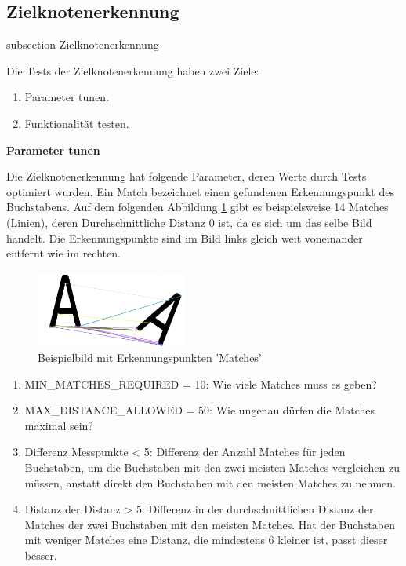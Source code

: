 



\subsection*{Zielknotenerkennung}\label{target-node-unittests}
    {subsection}
    {Zielknotenerkennung}

Die Tests der Zielknotenerkennung haben zwei Ziele:

\begin{enumerate}
    \item Parameter tunen.
    \item Funktionalität testen.
\end{enumerate}

\textbf{Parameter tunen}

Die Zielknotenerkennung hat folgende Parameter, deren Werte durch Tests optimiert wurden. Ein Match bezeichnet einen gefundenen Erkennungspunkt des Buchstabens. Auf dem folgenden Abbildung \ref{img:orb-example} gibt es beispielsweise 14 Matches (Linien), deren Durchschnittliche Distanz 0 ist, da es sich um das selbe Bild handelt. Die Erkennungspunkte sind im Bild links gleich weit voneinander entfernt wie im rechten.

\begin{figure}[H]
\centering
\includegraphics[width=5cm]{assets/IT/testing/target_node/orb-a.png}
\caption{Beispielbild mit Erkennungspunkten 'Matches'}
\label{img:orb-example}
\end{figure}

\begin{enumerate}
    \item MIN\_MATCHES\_REQUIRED = 10: Wie viele Matches muss es geben?
    \item MAX\_DISTANCE\_ALLOWED = 50: Wie ungenau dürfen die Matches maximal sein?
    \item Differenz Messpunkte < 5: Differenz der Anzahl Matches für jeden Buchstaben, um die Buchstaben mit den zwei meisten Matches vergleichen zu müssen, anstatt direkt den Buchstaben mit den meisten Matches zu nehmen.
    \item Distanz der Distanz > 5: Differenz in der durchschnittlichen Distanz der Matches der zwei Buchstaben mit den meisten Matches. Hat der Buchstaben mit weniger Matches eine Distanz, die mindestens 6 kleiner ist, passt dieser besser.
\end{enumerate}

